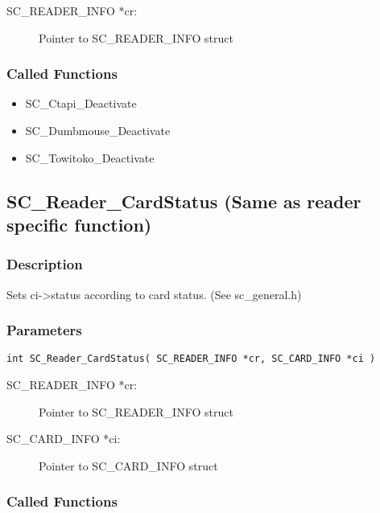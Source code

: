 \documentclass[a4paper,oneside]{article}
\begin{document}
\begin{description}
\item[SC\_READER\_INFO *cr:] Pointer to SC\_READER\_INFO struct
\end{description}

\subsubsection*{Called Functions}

\begin{itemize}
\item SC\_Ctapi\_Deactivate
\item SC\_Dumbmouse\_Deactivate
\item SC\_Towitoko\_Deactivate
\end{itemize}


\subsection{SC\_Reader\_CardStatus (Same as reader specific function)}

\subsubsection*{Description}

Sets ci->status according to card status. (See sc\_general.h)

\subsubsection*{Parameters}

\begin{verbatim}
int SC_Reader_CardStatus( SC_READER_INFO *cr, SC_CARD_INFO *ci )
\end{verbatim}

\begin{description}
\item[SC\_READER\_INFO *cr:] Pointer to SC\_READER\_INFO struct
\item[SC\_CARD\_INFO *ci:] Pointer to SC\_CARD\_INFO struct
\end{description}

\subsubsection*{Called Functions}
\end{document}

